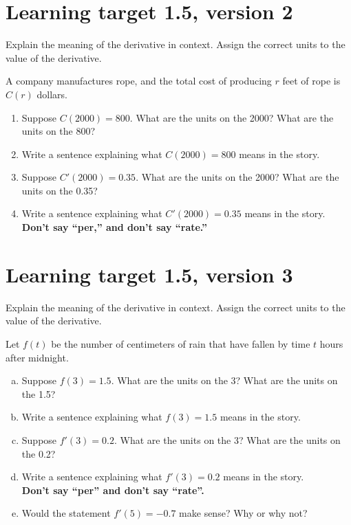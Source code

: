 \pagebreak

\section{Learning target 1.5, version 2}

Explain the meaning of the derivative in context. Assign the correct units to the value of the derivative.

\hrulefill

A company manufactures rope, and the total cost of producing $r$ feet of rope is $C(r)$ dollars.
\begin{enumerate}[leftmargin=0pt]
    \item Suppose $C(2000) = 800$. What are the units on the 2000? What are the units on the 800?
    \vfill
    \item Write a sentence explaining what $C(2000) = 800$ means in the story.
    \vfill
    \item Suppose $C'(2000) = 0.35$. What are the units on the 2000? What are the units on the 0.35?
    \vfill
    \item Write a sentence explaining what $C'(2000) = 0.35$ means in the story. \\
    \textbf{Don't say ``per,'' and don't say ``rate.''}
    \vfill
\end{enumerate}

\pagebreak

\section{Learning target 1.5, version 3}

Explain the meaning of the derivative in context. Assign the correct units to the value of the derivative.

\hrulefill

Let $f(t)$ be the number of centimeters of rain that have fallen by time $t$ hours after midnight.
\begin{enumerate}[(a)]

\item Suppose $f(3) = 1.5$. What are the units on the 3? What are the units on the 1.5?
\vfill
\item Write a sentence explaining what $f(3) = 1.5$ means in the story.
\vfill

\item Suppose $f'(3) = 0.2$. What are the units on the 3? What are the units on the 0.2?
\vfill
\item Write a sentence explaining what $f'(3) = 0.2$ means in the story.\\
\textbf{Don't say ``per'' and don't say ``rate''.}

\vfill
\item Would the statement $f'(5) = -0.7$ make sense?
Why or why not?

\end{enumerate}

